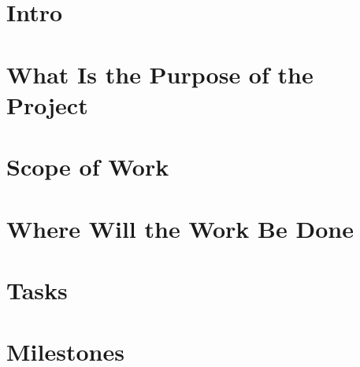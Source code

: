 \documentclass{article}
\begin{document}
  \section{Intro}
  \section{ What Is the Purpose of the Project}
  \section{ Scope of Work}
  \section{ Where Will the Work Be Done}
  \section{ Tasks}
  \section{ Milestones}
\end{document}
